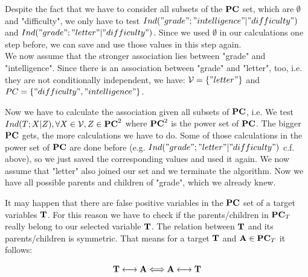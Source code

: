 			 \label{img.firstSelected}

			Despite the fact that we have to consider all subsets of the ${\textbf{PC}}$ set, which are $\emptyset$ and "difficulty", we only have to test $Ind("grade"; "intelligence" | "difficulty")$ and $Ind("grade"; "letter" | "difficulty")$. Since we used $\emptyset$ in our calculations one step before, we can save and use those values in this step again.\\
			We now assume that the stronger association lies between "grade" and "intelligence". Since there is an association between "grade" and "letter", too, i.e. they are not conditionally independent, we have: $\mathcal{V} = \{"letter"\}$ and $PC = \{"difficulty", "intelligence"\}$.

			 \label{img.secondSelected}

			Now we have to calculate the association given all subsets of ${\textbf{PC}}$, i.e. We test $Ind(T; X | Z), \forall X \in \mathcal{V}, Z \in {\textbf{PC}}^{2}$ where ${\textbf{PC}}^{2}$ is the power set of ${\textbf{PC}}$. The bigger ${\textbf{PC}}$ gets, the more calculations we have to do. Some of those calculations in the power set of ${\textbf{PC}}$ are done before (e.g. $Ind("grade"; "letter" | "difficulty")$ c.f. above), so we just saved the corresponding values and used it again. We now assume that "letter" also joined our set and we terminate the algorithm. Now we have all possible parents and children of "grade", which we already knew.

			 \label{img.thirdSelected}

			It may happen that there are false positive variables in the ${\textbf{PC}}$ set of a target variables ${\textbf{T}}$. For this reason we have to check if the parents/children in ${\textbf{PC}}_{T}$ really belong to our selected variable ${\textbf{T}}$. The relation between ${\textbf{T}}$ and its parents/children is symmetric. That means for a target ${\textbf{T}}$ and ${\textbf{A}} \in {\textbf{PC}}_{T}$ it follows:

			\begin{equation}
				{\textbf{T}} \longleftrightarrow {\textbf{A}} \Longleftrightarrow {\textbf{A}} \longleftrightarrow {\textbf{T}} \label{eq.symmetric}
			\end{equation}

